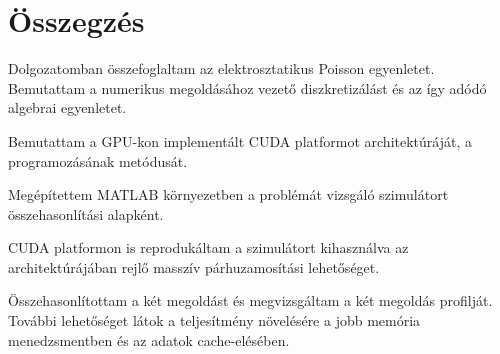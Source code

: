 \chapter{Összegzés}

Dolgozatomban összefoglaltam az elektrosztatikus Poisson egyenletet.
Bemutattam a numerikus megoldásához vezető diszkretizálást és az így
adódó algebrai egyenletet.

\noindent Bemutattam a GPU-kon implementált CUDA platformot architektúráját,
a programozásának metódusát.

\noindent Megépítettem MATLAB környezetben a problémát vizsgáló szimulátort
összehasonlítási alapként.

\noindent CUDA platformon is reprodukáltam a szimulátort 
kihasználva az architektúrájában rejlő masszív párhuzamosítási lehetőséget.

\noindent Összehasonlítottam a két megoldást és megvizsgáltam a két megoldás profilját.
\\

\noindent További lehetőséget látok a teljesítmény növelésére a jobb
memória menedzsmentben és az adatok cache-elésében.

